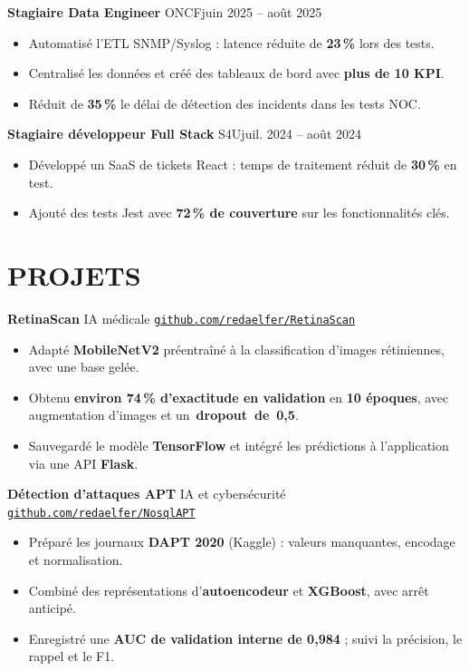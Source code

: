 \documentclass[11pt,a4paper]{article}
\newcommand{\entry}[2]{\noindent #1\hfill #2\par}
\newcommand{\jobgap}{\vspace{5pt}}
\begin{document}
\jobgap
\entry{\textbf{Stagiaire Data Engineer} \textbar{} ONCF}{juin 2025 -- août 2025}
\begin{itemize}
  \item Automatisé l'ETL SNMP/Syslog : latence réduite de \textbf{23\,\%} lors des tests.
  \item Centralisé les données et créé des tableaux de bord avec \textbf{plus de 10 KPI}.
  \item Réduit de \textbf{35\,\%} le délai de détection des incidents dans les tests NOC.
\end{itemize}

\jobgap
\entry{\textbf{Stagiaire développeur Full Stack} \textbar{} S4U}{juil. 2024 -- août 2024}
\begin{itemize}
  \item Développé un SaaS de tickets React : temps de traitement réduit de \textbf{30\,\%} en test.
  \item Ajouté des tests Jest avec \textbf{72\,\% de couverture} sur les fonctionnalités clés.
\end{itemize}

\section*{PROJETS}

\textbf{RetinaScan} \textbar{} IA médicale \textbar{} \href{https://github.com/redaelfer/RetinaScan}{\nolinkurl{github.com/redaelfer/RetinaScan}}\par
\begin{itemize}
  \item Adapté \textbf{MobileNetV2} préentraîné à la classification d'images rétiniennes, avec une base gelée.
  \item Obtenu \textbf{environ 74\,\% d'exactitude en validation} en \textbf{10 époques}, avec augmentation d'images et un~\textbf{dropout~de~0,5}.
  \item Sauvegardé le modèle \textbf{TensorFlow} et intégré les prédictions à l'application via une API \textbf{Flask}.
\end{itemize}

\jobgap
\textbf{Détection d'attaques APT} \textbar{} IA et cybersécurité \textbar{} \href{https://github.com/redaelfer/NosqlAPT}{\nolinkurl{github.com/redaelfer/NosqlAPT}}\par
\begin{itemize}
  \item Préparé les journaux \textbf{DAPT 2020} (Kaggle) : valeurs manquantes, encodage et normalisation.
  \item Combiné des représentations d'\textbf{autoencodeur} et \textbf{XGBoost}, avec arrêt anticipé.
  \item Enregistré une \textbf{AUC de validation interne de 0,984} ; suivi la précision, le rappel et le F1.
\end{itemize}
\end{document}
